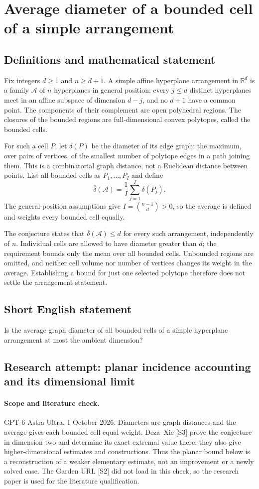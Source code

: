 \documentclass[11pt,a4paper]{article}
\begin{document}
\section*{Average diameter of a bounded cell of a simple arrangement}\label{statement}

\subsection{Definitions and mathematical statement}
Fix integers $d\ge1$ and $n\ge d+1$. A simple affine hyperplane
arrangement in $\mathbb R^d$ is a family $\mathcal A$ of $n$ hyperplanes
in general position: every $j\le d$ distinct hyperplanes meet in an
affine subspace of dimension $d-j$, and no $d+1$ have a common point.
The components of their complement are open polyhedral regions.
The closures of the bounded regions are full-dimensional convex polytopes,
called the bounded cells.

For such a cell $P$, let $\delta(P)$ be the diameter of its edge graph:
the maximum, over pairs of vertices, of the smallest number of polytope
edges in a path joining them. This is a combinatorial graph distance,
not a Euclidean distance between points. List all bounded cells as
$P_1,\ldots,P_I$ and define
\[
 \overline\delta(\mathcal A)=\frac1I\sum_{j=1}^I\delta(P_j).
\]
The general-position assumptions give $I=\binom{n-1}{d}>0$, so the
average is defined and weights every bounded cell equally.

The conjecture states that
$\overline\delta(\mathcal A)\le d$ for every such arrangement, independently
of $n$. Individual cells are allowed to have diameter greater than $d$;
the requirement bounds only the mean over all bounded cells.
Unbounded regions are omitted, and neither cell volume nor number of
vertices changes its weight in the average. Establishing a bound for just
one selected polytope therefore does not settle the arrangement statement.
\subsection{Short English statement}
Is the average graph diameter of all bounded cells of a simple hyperplane arrangement at most the ambient dimension?
\subsection{Research attempt: planar incidence accounting and its dimensional limit}
\paragraph{Scope and literature check.}
GPT-6 Astra Ultra, 1 October 2026. Diameters are graph distances and
the average gives each bounded cell equal weight. Deza--Xie [S3]
prove the conjecture in dimension two and determine its exact extremal
value there; they also give higher-dimensional estimates and constructions.
Thus the planar bound below is a reconstruction of a weaker elementary
estimate, not an improvement or a newly solved case. The Garden URL
[S2] did not load in this check, so the research paper is used for
the literature qualification.
\end{document}
